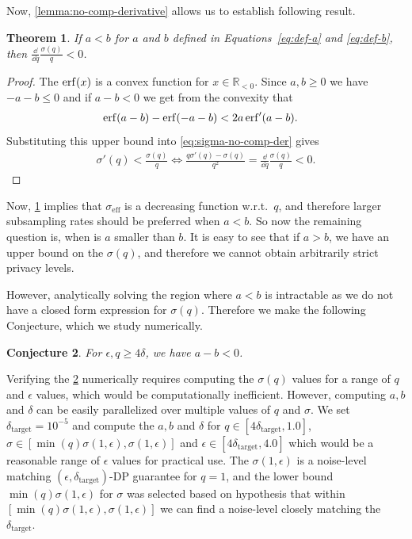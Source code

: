 \documentclass{article}
\theoremstyle{plain}
\newtheorem{theorem}{Theorem}[section]
\newtheorem{conjecture}[theorem]{Conjecture}
\theoremstyle{definition}
\theoremstyle{remark}
\begin{document}
Now, \cref{lemma:no-comp-derivative} allows us to establish following result.
\begin{theorem}
    \label{thm:no-comp-result}
    If $a < b$ for $a$ and $b$ defined in Equations~\eqref{eq:def-a} and \eqref{eq:def-b}, then
        $\frac{\dd}{\dd q} \frac{\sigma(q)}{q} < 0$.
\end{theorem}
\begin{proof}
   The $\erf(x)$ is a convex function for $x \in \mathbb{R}_{<0}$. Since $a, b \geq 0$
   we have $-a-b \leq 0$ and if $a-b < 0$ we get from the convexity that
   \begin{align}
       \erf(a-b) - \erf(-a-b) 
            &< 2a \erf'(a-b).
   \end{align}
   Substituting this upper bound into \cref{eq:sigma-no-comp-der} gives
   \begin{align}
       \sigma'(q) < \frac{\sigma(q)}{q} \Leftrightarrow \frac{q\sigma'(q)-\sigma(q)}{q^2} = \frac{\dd}{\dd q} \frac{\sigma(q)}{q} < 0.
   \end{align}
\end{proof}
Now, \cref{thm:no-comp-result} implies that $\sigma_{\text{eff}}$ is a decreasing 
function w.r.t.\ $q$, and therefore larger subsampling rates should be preferred when
$a < b$. So now the remaining question is, when is $a$ smaller than $b$. It is 
easy to see that if $a > b$, we have an upper bound on the $\sigma(q)$, and therefore
we cannot obtain arbitrarily strict privacy levels. 

However, analytically solving the region where $a < b$ is intractable as we do
not have a closed form expression for $\sigma(q)$. Therefore we make the following
Conjecture, which we study numerically.
\begin{conjecture}
    \label{conj:a-minus-b}
    For $\epsilon, q \geq 4 \delta$, we have $a-b < 0$.
\end{conjecture}

Verifying the \cref{conj:a-minus-b} numerically requires computing the $\sigma(q)$ values
for a range of $q$ and $\epsilon$ values, which would be computationally inefficient.
However, computing $a, b$ and $\delta$ can be easily parallelized over multiple
values of $q$ and $\sigma$. We set $\delta_{\text{target}}=10^{-5}$ and compute the 
$a, b$ and $\delta$ for $q \in [4 \delta_{\text{target}}, 1.0]$, 
$\sigma \in [\min(q) \sigma(1, \epsilon), \sigma(1, \epsilon)]$ and $\epsilon \in [4\delta_{\text{target}}, 4.0]$ 
which would be a reasonable range of $\epsilon$ values for practical use. The 
$\sigma(1, \epsilon)$ is a noise-level matching $(\epsilon, \delta_{\text{target}})$-DP guarantee for $q=1$,
and the lower bound $\min(q) \sigma(1, \epsilon)$ for $\sigma$ was selected based on hypothesis 
that within $[\min(q) \sigma(1, \epsilon), \sigma(1, \epsilon)]$ we can find a noise-level closely
matching the $\delta_{\text{target}}$.
\end{document}
